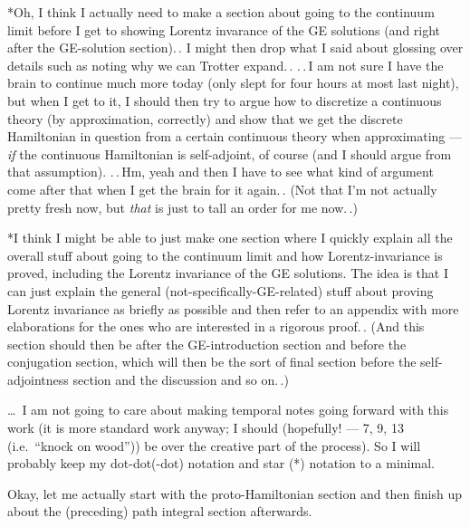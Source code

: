 \documentclass{report}
\begin{document}
*Oh, I think I actually need to make a section about going to the continuum limit before I get to showing Lorentz invarance of the GE solutions (and right after the GE-solution section).\,. I might then drop what I said about glossing over details such as noting why we can Trotter expand.\,. .\,.\,I am not sure I have the brain to continue much more today (only slept for four hours at most last night), %
but when I get to it, I should then try to argue how to discretize a continuous theory (by approximation, correctly) and show that we get the discrete Hamiltonian in question from a certain continuous theory when approximating --- \emph{if} the continuous Hamiltonian is self-adjoint, of course (and I should argue from that assumption). .\,.\,Hm, yeah and then I have to see what kind of argument come after that when I get the brain for it again.\,. (Not that I'm not actually pretty fresh now, but \emph{that} is just to tall an order for me now.\,.)

*I think I might be able to just make one section where I quickly explain all the overall stuff about going to the continuum limit and how Lorentz-invariance is proved, including the Lorentz invariance of the GE solutions. The idea is that I can just explain the general (not-specifically-GE-related) stuff about proving Lorentz invariance as briefly as possible and then refer to an appendix with more elaborations for the ones who are interested in a rigorous proof.\,. (And this section should then be after the GE-introduction section and before the conjugation section, which will then be the sort of final section before the self-adjointness section and the discussion and so on.\,.) 



\ldots\ I am not going to care about making temporal notes going forward with this work (it is more standard work anyway; I should (hopefully! --- 7, 9, 13 (i.e.\ ``knock on wood'')) be over the creative part of the process). So I will probably keep my dot-dot(-dot) notation and star (*) notation to a minimal. %

Okay, let me actually start with the proto-Hamiltonian section and then finish up about the (preceding) path integral section afterwards.
\end{document}
